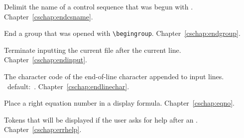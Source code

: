 \begin{glossinventory}
\item [\cs{endcsname}]
      Delimit the name of a control sequence that was begun
      with .
Chapter~\ref{cschap:endcsname}.

\item [\cs{endgroup}]
      End a group that was opened with \verb-\begingroup-.
Chapter~\ref{cschap:endgroup}.

\item [\cs{endinput}]
      Terminate inputting the current file after the current line.
Chapter~\ref{cschap:endinput}.

\item [\cs{endlinechar}] 
      The character code of the end-of-line character 
      appended to input lines.
      \IniTeX\ default:~.
Chapter~\ref{cschap:endlinechar}.

\item [\cs{eqno\gr{math mode material}\n{\char36\char36}}]
      Place a right equation number in a display formula.
Chapter~\ref{cschap:eqno}.

\item [\cs{errhelp}]
      Tokens that will be displayed if the user 
      asks for help after an .
Chapter~\ref{cschap:errhelp}.


\end{glossinventory}
